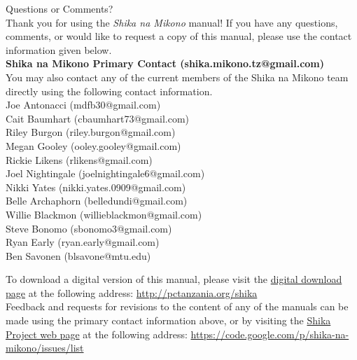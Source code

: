 \begin{center}
{\Huge Questions or Comments?}\\[12pt]
Thank you for using the \textit{Shika na Mikono} manual! If you have any questions, comments, or would like to request a copy of this manual, please use the contact information given below.\\[20pt]
\textbf{Shika na Mikono Primary Contact (shika.mikono.tz@gmail.com)}\\[20pt]
You may also contact any of the current members of the Shika na Mikono team directly using the following contact information.\\[20pt]
Joe Antonacci (mdfb30@gmail.com)\\
Cait Baumhart (cbaumhart73@gmail.com)\\
Riley Burgon (riley.burgon@gmail.com)\\
Megan Gooley (ooley.gooley@gmail.com)\\
Rickie Likens (rlikens@gmail.com)\\
Joel Nightingale (joelnightingale6@gmail.com)\\
Nikki Yates (nikki.yates.0909@gmail.com)\\
\vspace{6pt}
Belle Archaphorn (belledundi@gmail.com)\\
Willie Blackmon (willieblackmon@gmail.com)\\
Steve Bonomo (sbonomo3@gmail.com)\\
Ryan Early (ryan.early@gmail.com)\\
Ben Savonen (blsavone@mtu.edu)\\

\end{center}
\vfill
To download a digital version of this manual, please visit the \href{http://pctanzania.org/shika}{digital download page} at the following address: \url{http://pctanzania.org/shika}\\

\noindent Feedback and requests for revisions to the content of any of the manuals can be made using the primary contact information above, or by visiting the \href{https://code.google.com/p/shika-na-mikono/issues/list}{Shika Project web page} at the following address: \url{https://code.google.com/p/shika-na-mikono/issues/list}